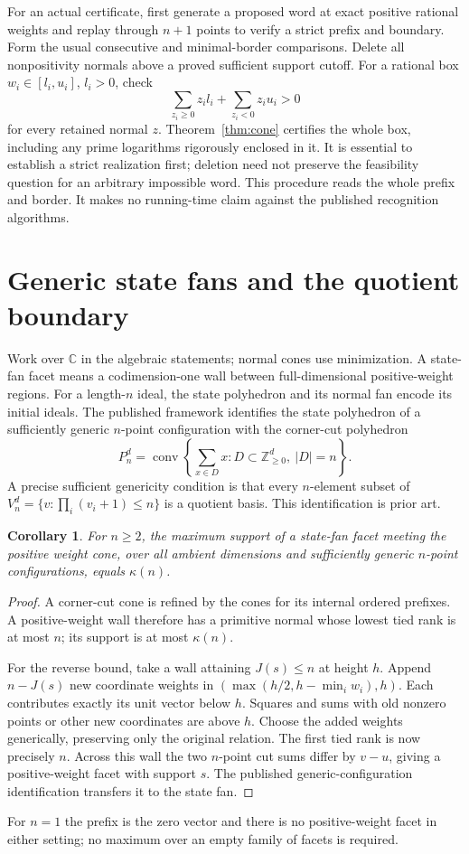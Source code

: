 \documentclass[11pt,a4paper]{article}
\newtheorem{corollary}[theorem]{Corollary}
\theoremstyle{remark}\newtheorem{remark}[theorem]{Remark}
\newcommand{\NN}{\mathbb Z_{\geq0}}
\begin{document}
For an actual certificate, first generate a proposed word at
exact positive rational weights and replay through \(n+1\)
points to verify a strict prefix and boundary. Form the usual
consecutive and minimal-border comparisons. Delete all
nonpositivity normals above a proved sufficient support cutoff.
For a rational box \(w_i\in[l_i,u_i]\), \(l_i>0\), check
\[
 \sum_{z_i\geq0}z_i l_i+\sum_{z_i<0}z_i u_i>0
\]
for every retained normal \(z\). Theorem~\ref{thm:cone}
certifies the whole box, including any prime logarithms
rigorously enclosed in it. It is essential to establish a strict
realization first; deletion need not preserve the feasibility
question for an arbitrary impossible word. This procedure reads
the whole prefix and border. It makes no running-time claim
against the published recognition algorithms.

\section{Generic state fans and the quotient boundary}
Work over \(\mathbb C\) in the algebraic statements; normal cones
use minimization. A state-fan
facet means a codimension-one wall between full-dimensional
positive-weight regions. For a length-\(n\) ideal, the state polyhedron and its normal fan
encode its initial ideals. The published framework
\cite{OS99,BOT03} identifies the state polyhedron of a sufficiently
generic \(n\)-point configuration with the corner-cut polyhedron
\[
 P_n^d=\operatorname{conv}\left\{\sum_{x\in D}x:
                     D\subset\NN^d,\ |D|=n\right\}.
\]
A precise sufficient genericity condition is that every
\(n\)-element subset of
\(V_n^d=\{v:\prod_i(v_i+1)\leq n\}\) is a quotient basis.
This identification is prior art.

\begin{corollary}\label{cor:generic}
For \(n\geq2\), the maximum support of a state-fan facet meeting the positive
weight cone, over all ambient dimensions and sufficiently
generic \(n\)-point configurations, equals \(\kappa(n)\).
\end{corollary}
\begin{proof}
A corner-cut cone is refined by the cones for its internal
ordered prefixes. A positive-weight wall therefore has a
primitive normal whose lowest tied rank is at most \(n\);
its support is at most \(\kappa(n)\).

For the reverse bound, take a wall attaining \(J(s)\leq n\)
at height \(h\). Append \(n-J(s)\) new coordinate weights in
\((\max(h/2,h-\min_iw_i),h)\). Each contributes exactly its
unit vector below \(h\). Squares and sums with old nonzero
points or other new coordinates are above \(h\).
Choose the added weights generically, preserving only the
original relation. The first tied rank is now precisely \(n\).
Across this wall the two \(n\)-point cut sums differ by \(v-u\),
giving a positive-weight facet with support \(s\).
The published generic-configuration identification transfers it
to the state fan.
\end{proof}
For \(n=1\) the prefix is the zero vector and there is no
positive-weight facet in either setting; no maximum over an
empty family of facets is required.
\end{document}
